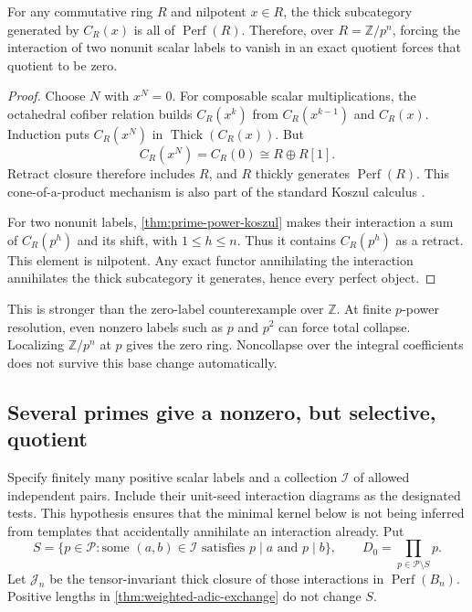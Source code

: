 \begin{theorem}\label{thm:nilpotent-collapse}
For any commutative ring $R$ and nilpotent $x\in R$, the thick subcategory generated by $C_R(x)$ is all of $\operatorname{Perf}(R)$. Therefore, over $R=\mathbb Z/p^n$, forcing the interaction of two nonunit scalar labels to vanish in an exact quotient forces that quotient to be zero.
\end{theorem}
\begin{proof}
Choose $N$ with $x^N=0$. For composable scalar multiplications, the octahedral cofiber relation builds $C_R(x^k)$ from $C_R(x^{k-1})$ and $C_R(x)$. Induction puts $C_R(x^N)$ in $\operatorname{Thick}(C_R(x))$. But
\[
 C_R(x^N)=C_R(0)\cong R\oplus R[1].
\]
Retract closure therefore includes $R$, and $R$ thickly generates $\operatorname{Perf}(R)$. This cone-of-a-product mechanism is also part of the standard Koszul calculus \cite{StacksKoszul}.

For two nonunit labels, \cref{thm:prime-power-koszul} makes their interaction a sum of $C_R(p^h)$ and its shift, with $1\leq h\leq n$. Thus it contains $C_R(p^h)$ as a retract. This element is nilpotent. Any exact functor annihilating the interaction annihilates the thick subcategory it generates, hence every perfect object.
\end{proof}

This is stronger than the zero-label counterexample over $\mathbb Z$. At finite $p$-power resolution, even nonzero labels such as $p$ and $p^2$ can force total collapse. Localizing $\mathbb Z/p^n$ at $p$ gives the zero ring. Noncollapse over the integral coefficients does not survive this base change automatically.

\subsection{Several primes give a nonzero, but selective, quotient}

Specify finitely many positive scalar labels and a collection $\mathcal I$ of allowed independent pairs. Include their unit-seed interaction diagrams as the designated tests. This hypothesis ensures that the minimal kernel below is not being inferred from templates that accidentally annihilate an interaction already. Put
\[
 S=\{p\in\mathcal P:\text{some }(a,b)\in\mathcal I
                    \text{ satisfies }p\mid a\text{ and }p\mid b\},
 \qquad D_0=\prod_{p\in\mathcal P\setminus S}p.
\]
Let $\mathcal J_n$ be the tensor-invariant thick closure of those interactions in $\operatorname{Perf}(B_n)$. Positive lengths in \cref{thm:weighted-adic-exchange} do not change $S$.

